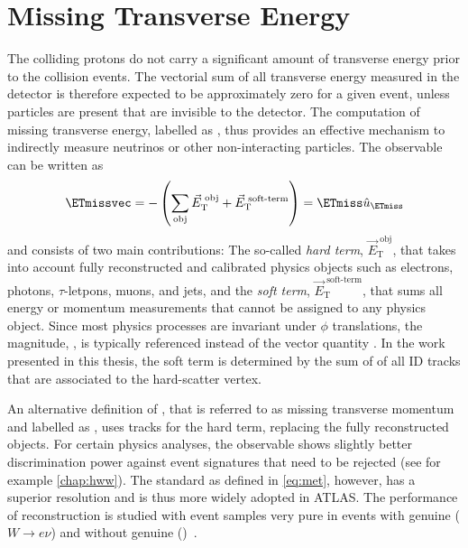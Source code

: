 \section{Missing Transverse Energy}
The colliding protons do not carry a significant amount of transverse energy prior to the collision events.
The vectorial sum of all transverse energy measured in the detector is therefore expected to be approximately zero for a given event, unless particles are present that are invisible to the detector. The computation of missing transverse energy, labelled as \ETmissvec, thus provides an effective mechanism to indirectly measure neutrinos or other non-interacting particles.
The \ETmissvec observable can be written as
\begin{equation}
    \ETmissvec = - \left( \sum_{\text{obj}} \vec{E}_{\text{T}}^\text{ obj} + \vec{E}_{\text{T}}^\text{ soft-term} \right)
    = \ETmiss \hat{u}_{\ETmiss}
    \label{eq:met}
\end{equation}
and consists of two main contributions: The so-called \emph{hard term}, $\vec{E}_{\text{T}}^\text{ obj}$, that takes into account fully reconstructed and calibrated physics objects such as electrons, photons, $\tau$-letpons, muons, and jets, and the \emph{soft term}, $\vec{E}_{\text{T}}^\text{ soft-term}$, that sums all energy or momentum measurements that cannot be assigned to any physics object.
Since most physics processes are invariant under $\phi$ translations, the magnitude, \ETmiss, is typically referenced instead of the vector quantity \ETmissvec.
In the work presented in this thesis, the soft term is determined by the sum of \pT of all ID tracks that are associated to the hard-scatter vertex.

An alternative definition of \ETmiss, that is referred to as missing transverse momentum and labelled as \pTmiss, uses tracks for the hard term, replacing the fully reconstructed objects.
For certain physics analyses, the \pTmiss observable shows slightly better discrimination power against event signatures that need to be rejected (see for example \cref{chap:hww}). The standard \ETmiss as defined in \cref{eq:met}, however, has a superior resolution and is thus more widely adopted in ATLAS.
The performance of \ETmiss reconstruction is studied with event samples very pure in events with genuine \ETmiss ($W \rightarrow e\nu$) and without genuine \ETmiss (\Zmumu)~\cite{PERF-2016-07}.

